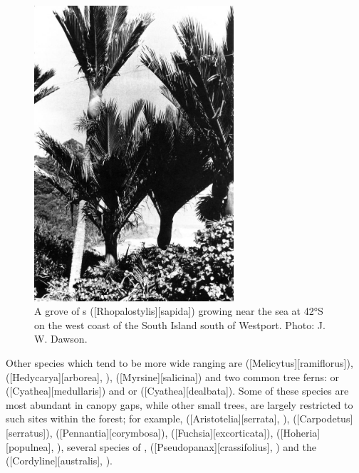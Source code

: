 \begin{figure}
	\includegraphics[width=0.66\textwidth]{graphics/fig_060}
	\centering
	\caption[A grove of nikau palms]{A grove of s ([Rhopalostylis][sapida]) growing near the sea at \ang{42}S on the west coast of the South Island south of Westport. Photo:  J. W. Dawson.}%
	\label{fig:60nikau}
\end{figure}

Other species which tend to be more wide ranging are  ([Melicytus][ramiflorus]),  ([Hedycarya][arborea], ),  ([Myrsine][salicina]) and two common tree ferns:  or  ([Cyathea][medullaris]) and  or  ([Cyathea][dealbata]).
Some of these species are most abundant in canopy gaps, while other small trees, are largely restricted to such sites within the forest; for example,  ([Aristotelia][serrata], ),  ([Carpodetus][serratus]),  ([Pennantia][corymbosa]),  ([Fuchsia][excorticata]),  ([Hoheria][populnea], ), several species of ,  ([Pseudopanax][crassifolius], ) and the  ([Cordyline][australis], ).

